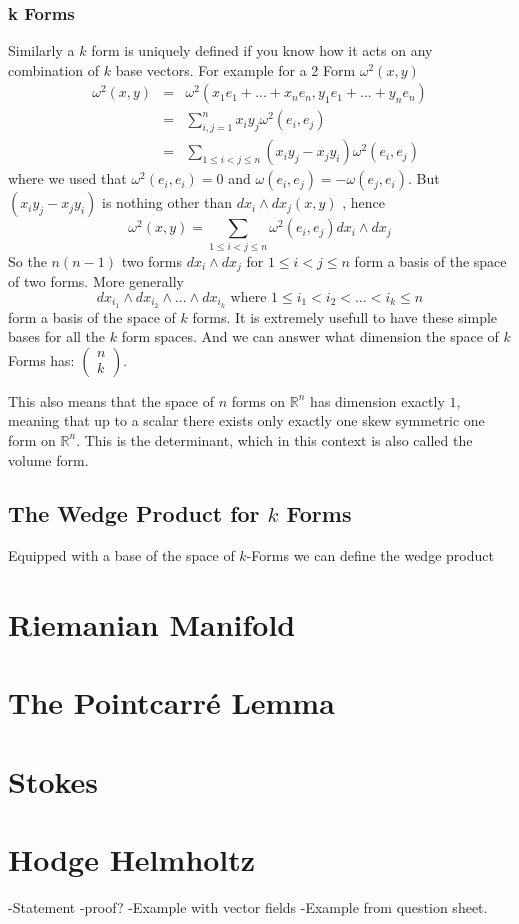 \subsubsection*{\textbf{k Forms}}
Similarly a $k$ form is uniquely defined if you know how it acts on any combination of $k$ base vectors. For example for a 2 Form $\omega^2(x,y)$
\begin{eqnarray}
\omega^2(x,y) &=& \omega^2(x_1e_1+...+x_ne_n,y_1e_1+...+y_ne_n) \\
 &=& \sum_{i,j=1}^n x_iy_j\omega^2(e_i,e_j) \\
 &=& \sum_{1\leq i<j\leq n}(x_iy_j-x_jy_i)\omega^2(e_i,e_j)
\end{eqnarray}
where we used that $\omega^2(e_i,e_i)=0$ and $\omega(e_i,e_j) = -\omega(e_j,e_i)$. But $(x_iy_j-x_jy_i)$ is nothing other than $dx_i\wedge dx_j(x,y)$ , hence
\[\omega^2(x,y) = \sum_{1\leq i<j\leq n} \omega^2(e_i,e_j)dx_i\wedge dx_j\]
So the $n(n-1)$ two forms $dx_i\wedge dx_j$ for $1\leq i<j\leq n$ form a basis of the space of two forms. More generally 
\[dx_{i_1}\wedge dx_{i_2}\wedge...\wedge dx_{i_k} \text{ where } 1\leq i_1 <i_2 <...<i_k \leq n\]
form a basis of the space of $k$ forms. It is extremely usefull to have these simple bases for all the $k$ form spaces.
And we can answer what dimension the space of $k$ Forms has: $\begin{pmatrix} n \\k \end{pmatrix}$.

This also means that the space of $n$ forms on $\mathbb R^n$ has dimension exactly $1$, meaning that up to a scalar there exists only exactly one skew symmetric one form on $\mathbb R^n$. This is the determinant, which in this context is also called the volume form.
\subsection{The Wedge Product for $k$ Forms}
Equipped with a base of the space of $k$-Forms we can define the wedge product
\section{Riemanian Manifold}

\section{The Pointcarré Lemma}
\section{Stokes}
\section{Hodge Helmholtz}
-Statement
-proof?
-Example with vector fields
-Example from question sheet.